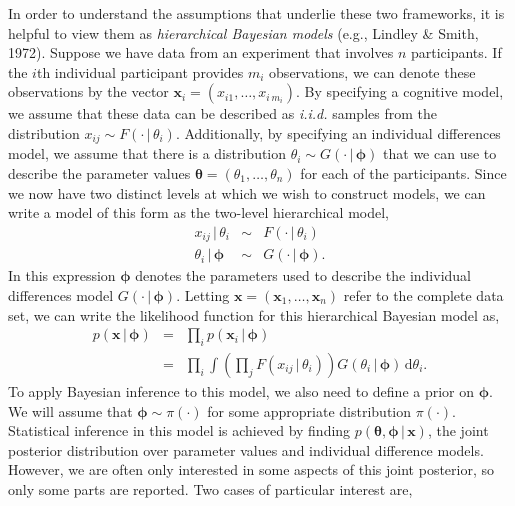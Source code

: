 \documentclass[authoryear]{elsarticle}
\newcommand{\condon}{\,|\,}
\newcommand{\vctr}[1]{\bm{#1}}
\begin{document}
In order to understand the assumptions that underlie these two
frameworks, it is helpful to view them as {\em hierarchical
Bayesian models} (e.g., Lindley \& Smith, 1972). Suppose we have
data from an experiment that involves $n$ participants. If the $i$th
individual participant provides $m_i$ observations, we can denote
these observations by the vector $\vctr{x}_{i}=(x_{i1}, \ldots, x_{i \,m_i})$.
By specifying a cognitive model, we assume that these
data can be described as {\it i.i.d.} samples from the distribution
$x_{ij} \sim F(\cdot \condon \theta_i)$.  Additionally, by specifying an individual differences model, we assume
that there is a distribution $\theta_i \sim G(\cdot \condon \vctr{\phi})$
that we can use to describe the parameter values $\vctr{\theta}=
(\theta_1, \ldots, \theta_n)$ for each of the participants. Since we
now have two distinct levels at which we wish to construct models,
we can write a model of this form as the two-level hierarchical model,
\begin{equation}
        \begin{array}{rcl}
        x_{ij} \condon \theta_i & \sim & F(\cdot \condon \theta_i)\\
        \theta_i \condon \vctr{\phi} & \sim & G(\cdot \condon \vctr{\phi}).
        \end{array}
        \label{hmod}
\end{equation}
\noindent In this expression $\vctr{\phi}$ denotes the parameters used
to describe the individual differences model $G(\cdot \condon \vctr{\phi})$.
Letting $\vctr{x}=(\vctr{x}_1,
\ldots, \vctr{x}_n)$ refer to the complete data set, we can write the
likelihood function for this hierarchical Bayesian model as,
\begin{eqnarray}
        p(\vctr{x} \condon \vctr{\phi})  &=&
        \prod_i p(\vctr{x}_i \condon \vctr{\phi})  \nonumber \\
        &=& \prod_i \int \left( \prod_j  F(x_{ij} \condon \theta_i) \right)
        G(\theta_i \condon \vctr{\phi}) \, \mathrm{d}\theta_i.
\end{eqnarray}
To apply Bayesian inference to this model, we also need to define a prior
on $\vctr{\phi}$. We will assume that $\vctr{\phi} \sim \pi(\cdot)$ for
some appropriate distribution $\pi(\cdot)$. Statistical inference in this
model is achieved by finding $p(\vctr{\theta}, \vctr{\phi} \condon \vctr{x})$,
the joint posterior distribution over parameter values and individual difference
models. However, we are often only interested in some aspects of this joint
posterior, so only some parts are reported. Two cases of particular interest are,
\end{document}
